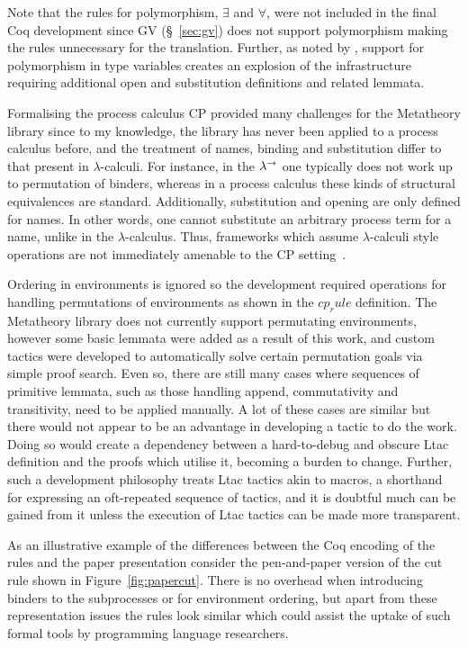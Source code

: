 Note that the rules for polymorphism, $\exists$ and $\forall$, were not
included in the final Coq development since GV (\S~\ref{sec:gv}) does not
support polymorphism making the rules unnecessary for the
translation. Further, as noted by \citeauthor{Lee:2012}, support for
polymorphism in type variables creates an explosion of the infrastructure
requiring additional open and substitution definitions and related lemmata.

Formalising the process calculus CP provided many challenges for the
Metatheory library since to my knowledge, the library has never been applied
to a process calculus before, and the treatment of names, binding and
substitution differ to that present in $\lambda$-calculi. For instance, in the
$\lambda^\rightarrow$ one typically does not work up to permutation of binders, whereas in a
process calculus these kinds of structural equivalences are
standard. Additionally, substitution and opening are only defined for
names. In other words, one cannot substitute an arbitrary process term for a
name, unlike in the $\lambda$-calculus. Thus, frameworks which assume
$\lambda$-calculi style operations are not immediately amenable to the CP
setting~\cite{Lee:2012}.

Ordering in environments is ignored so the development required operations for
handling permutations of environments as shown in the \coqe$cp_rule$
definition. The Metatheory library does not currently support permutating
environments, however some basic lemmata were added as a result of this work,
and custom tactics were developed to automatically solve certain permutation
goals via simple proof search. Even so, there are still many cases where
sequences of primitive lemmata, such as those handling append, commutativity
and transitivity, need to be applied manually. A lot of these cases are
similar but there would not appear to be an advantage in developing a tactic
to do the work. Doing so would create a dependency between a hard-to-debug and
obscure Ltac definition and the proofs which utilise it, becoming a burden to
change. Further, such a development philosophy treats Ltac tactics akin to
macros, a shorthand for expressing an oft-repeated sequence of tactics, and it
is doubtful much can be gained from it unless the execution of Ltac tactics
can be made more transparent.

As an illustrative example of the differences between the Coq encoding of the
rules and the paper presentation consider the pen-and-paper version of the cut
rule shown in Figure~\ref{fig:papercut}. There is no overhead when introducing
binders to the subprocesses or for environment ordering, but apart from these
representation issues the rules look similar which could assist the uptake of
such formal tools by programming language researchers.

